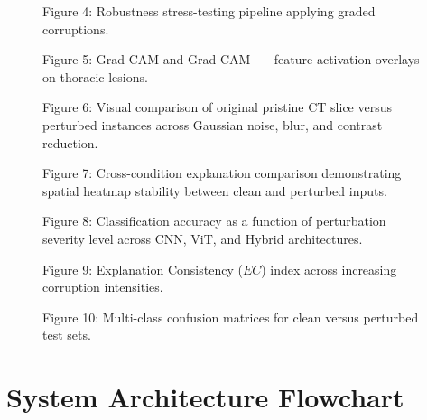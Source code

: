 \documentclass[conference]{IEEEtran}
\begin{document}
\begin{figure}[htbp]
\centering
\fbox{\rule{0pt}{1.5in} \rule{0.88\linewidth}{0pt}}
\caption{Figure 4: Robustness stress-testing pipeline applying graded corruptions.}
\label{fig:fig4}
\end{figure}

\begin{figure}[htbp]
\centering
\fbox{\rule{0pt}{1.6in} \rule{0.88\linewidth}{0pt}}
\caption{Figure 5: Grad-CAM and Grad-CAM++ feature activation overlays on thoracic lesions.}
\label{fig:fig5}
\end{figure}

\begin{figure}[htbp]
\centering
\fbox{\rule{0pt}{1.6in} \rule{0.88\linewidth}{0pt}}
\caption{Figure 6: Visual comparison of original pristine CT slice versus perturbed instances across Gaussian noise, blur, and contrast reduction.}
\label{fig:fig6}
\end{figure}

\begin{figure}[htbp]
\centering
\fbox{\rule{0pt}{1.6in} \rule{0.88\linewidth}{0pt}}
\caption{Figure 7: Cross-condition explanation comparison demonstrating spatial heatmap stability between clean and perturbed inputs.}
\label{fig:fig7}
\end{figure}

\begin{figure}[htbp]
\centering
\fbox{\rule{0pt}{1.5in} \rule{0.88\linewidth}{0pt}}
\caption{Figure 8: Classification accuracy as a function of perturbation severity level across CNN, ViT, and Hybrid architectures.}
\label{fig:fig8}
\end{figure}

\begin{figure}[htbp]
\centering
\fbox{\rule{0pt}{1.5in} \rule{0.88\linewidth}{0pt}}
\caption{Figure 9: Explanation Consistency ($EC$) index across increasing corruption intensities.}
\label{fig:fig9}
\end{figure}

\begin{figure}[htbp]
\centering
\fbox{\rule{0pt}{1.5in} \rule{0.88\linewidth}{0pt}}
\caption{Figure 10: Multi-class confusion matrices for clean versus perturbed test sets.}
\label{fig:fig10}
\end{figure}

\section{System Architecture Flowchart}
\label{sec:system_diagram}
\end{document}
